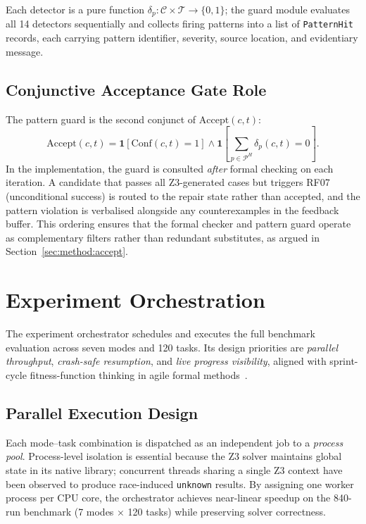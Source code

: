 Each detector is a pure function $\delta_p : \mathcal{C} \times \mathcal{T}
\to \{0,1\}$; the guard module evaluates all 14 detectors sequentially and
collects firing patterns into a list of \texttt{PatternHit} records, each
carrying pattern identifier, severity, source location, and evidentiary
message.

\subsection{Conjunctive Acceptance Gate Role}

The pattern guard is the second conjunct of $\mathrm{Accept}(c,t)$:
\[
  \mathrm{Accept}(c, t) =
    \mathbf{1}\!\left[\mathrm{Conf}(c, t) = 1\right]
    \land
    \mathbf{1}\!\left[\sum_{p \in \mathcal{P}^H} \delta_p(c, t) = 0\right].
\]
In the implementation, the guard is consulted \emph{after} formal checking
on each iteration.  A candidate that passes all Z3-generated cases but
triggers RF07 (unconditional success) is routed to the repair state rather
than accepted, and the pattern violation is verbalised alongside any
counterexamples in the feedback buffer.  This ordering ensures that the
formal checker and pattern guard operate as complementary filters rather
than redundant substitutes, as argued in Section~\ref{sec:method:accept}.

\section{Experiment Orchestration}
\label{sec:impl:orchestration}

The experiment orchestrator schedules and executes the full benchmark
evaluation across seven modes and 120 tasks.  Its design priorities are
\emph{parallel throughput}, \emph{crash-safe resumption}, and
\emph{live progress visibility}, aligned with sprint-cycle fitness-function
thinking in agile formal methods~\citep{harman2012formalagile,beck2001xp}.

\subsection{Parallel Execution Design}

Each mode--task combination is dispatched as an independent job to a
\emph{process pool}.  Process-level isolation is essential because the Z3
solver maintains global state in its native library; concurrent threads
sharing a single Z3 context have been observed to produce race-induced
\texttt{unknown} results.  By assigning one worker process per CPU core,
the orchestrator achieves near-linear speedup on the 840-run benchmark
(7 modes $\times$ 120 tasks) while preserving solver correctness.

